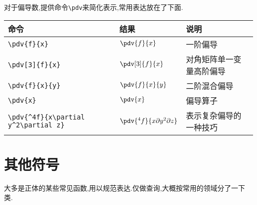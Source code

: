 \documentclass[lang=cn,12pt,scheme=chinese,mode=simple,black]{elegantbook}
\begin{document}
对于偏导数,提供命令\verb|\pdv|来简化表示,常用表达放在了下面.
\begin{center}
    \renewcommand{\arraystretch}{1.4}
    \setlength{\tabcolsep}{10pt}
    \begin{tabular}{|l|l|l|}
        \hline
        \textbf{命令}                             & \textbf{结果}                        & \textbf{说明}            \\
        \hline
        \verb|\pdv{f}{x}|                         & $\pdv{f}{x}$                         & 一阶偏导                 \\
        \verb|\pdv[3]{f}{x}|                      & $\pdv[3]{f}{x}$                      & 对角矩阵单一变量高阶偏导 \\
        \verb|\pdv{f}{x}{y}|                      & $\pdv{f}{x}{y}$                      & 二阶混合偏导             \\
        \verb|\pdv{x}|                            & $\pdv{x}$                            & 偏导算子                 \\
        \verb|\pdv{^4f}{x\partial y^2\partial z}| & $\pdv{^4f}{x\partial y^2\partial z}$ & 表示复杂偏导的一种技巧   \\
        \hline
    \end{tabular}
\end{center}

\newpage
\section{其他符号}
大多是正体的某些常见函数,用以规范表达.仅做查询,大概按常用的领域分了一下类.
\end{document}
